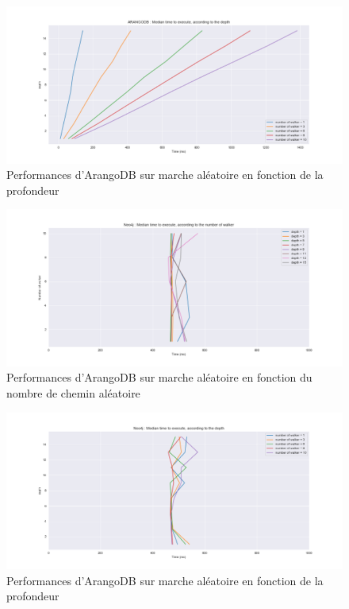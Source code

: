 \documentclass{article} %
\begin{document}
\begin{figure}[!h]
	\centering
	\includegraphics[keepaspectratio = true,scale=0.4]{arangoDB_depth_time.png}
	\caption{Performances d'ArangoDB sur marche aléatoire en fonction de la profondeur}
	\label{fig:ardepth}
\end{figure}
\newpage

\begin{figure}[!h]
	\centering
	\includegraphics[keepaspectratio = true,scale=0.4]{neo4j_nbwalker_time.png}
	\caption{Performances d'ArangoDB sur marche aléatoire en fonction du nombre de chemin aléatoire}
	\label{fig:newalk}
\end{figure}


\begin{figure}[!h]
	\centering
	\includegraphics[keepaspectratio = true,scale=0.4]{neo4j_depth_time.png}
	\caption{Performances d'ArangoDB sur marche aléatoire en fonction de la profondeur}
	\label{fig:nedepth}
\end{figure}
\newpage
\end{document}
